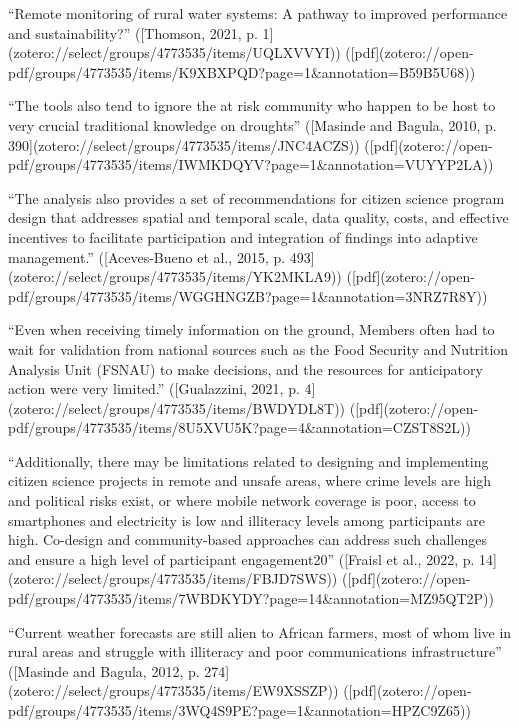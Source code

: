 “Remote monitoring of rural water systems: A pathway to improved performance and sustainability?” ([Thomson, 2021, p. 1](zotero://select/groups/4773535/items/UQLXVVYI)) ([pdf](zotero://open-pdf/groups/4773535/items/K9XBXPQD?page=1&annotation=B59B5U68))

“The tools also tend to ignore the at risk community who happen to be host to very crucial traditional knowledge on droughts” ([Masinde and Bagula, 2010, p. 390](zotero://select/groups/4773535/items/JNC4ACZS)) ([pdf](zotero://open-pdf/groups/4773535/items/IWMKDQYV?page=1&annotation=VUYYP2LA))

“The analysis also provides a set of recommendations for citizen science program design that addresses spatial and temporal scale, data quality, costs, and effective incentives to facilitate participation and integration of findings into adaptive management.” ([Aceves-Bueno et al., 2015, p. 493](zotero://select/groups/4773535/items/YK2MKLA9)) ([pdf](zotero://open-pdf/groups/4773535/items/WGGHNGZB?page=1&annotation=3NRZ7R8Y))

“Even when receiving timely information on the ground, Members often had to wait for validation from national sources such as the Food Security and Nutrition Analysis Unit (FSNAU) to make decisions, and the resources for anticipatory action were very limited.” ([Gualazzini, 2021, p. 4](zotero://select/groups/4773535/items/BWDYDL8T)) ([pdf](zotero://open-pdf/groups/4773535/items/8U5XVU5K?page=4&annotation=CZST8S2L))


“Additionally, there may be limitations related to designing and implementing citizen science projects in remote and unsafe areas, where crime levels are high and political risks exist, or where mobile network coverage is poor, access to smartphones and electricity is low and illiteracy levels among participants are high. Co-design and community-based approaches can address such challenges and ensure a high level of participant engagement20” ([Fraisl et al., 2022, p. 14](zotero://select/groups/4773535/items/FBJD7SWS)) ([pdf](zotero://open-pdf/groups/4773535/items/7WBDKYDY?page=14&annotation=MZ95QT2P))

“Current weather forecasts are still alien to African farmers, most of whom live in rural areas and struggle with illiteracy and poor communications infrastructure” ([Masinde and Bagula, 2012, p. 274](zotero://select/groups/4773535/items/EW9XSSZP)) ([pdf](zotero://open-pdf/groups/4773535/items/3WQ4S9PE?page=1&annotation=HPZC9Z65))



